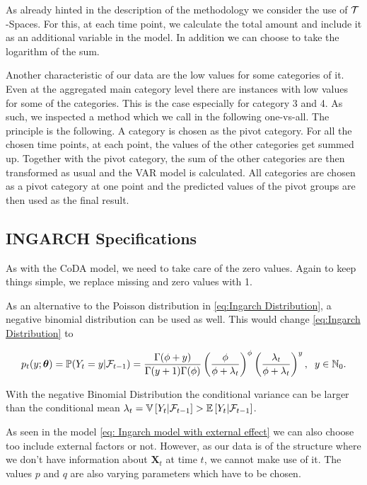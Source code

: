 As already hinted in the description of the methodology we consider the use of $\mathcal{T}$-Spaces. For this, at each time point, we calculate the total amount and include it as an additional variable in the model. In addition we can choose to take the logarithm of the sum. 

Another characteristic of our data are the low values for some categories of it. Even at the aggregated main category level there are instances with low values for some of the categories. This is the case especially for category 3 and 4. As such, we inspected a method which we call in the following one-vs-all. The principle is the following. A category is chosen as the pivot category. For all the chosen time points, at each point, the values of the other categories get summed up. Together with the pivot category, the sum of the other categories are then transformed as usual and the VAR model is calculated. All categories are chosen as a pivot category at one point and the predicted values of the pivot groups are then used as the final result. 


\subsection{INGARCH Specifications}
\label{sec: Ingarch Specifications}

As with the CoDA model, we need to take care of the zero values. Again to keep things simple, we replace missing and zero values with 1. 

As an alternative to the Poisson distribution in \ref{eq:Ingarch Distribution}, a negative binomial distribution can be used as well. This would change \ref{eq:Ingarch Distribution} to 

\begin{equation*}
p_t(y;\bm{\theta})=\mathbb{P}(Y_t=y | \mathcal{F}_{t-1}) = \frac{\Gamma(\phi+y)}{\Gamma(y+1)\Gamma(\phi)}\left(\frac{\phi}{\phi+\lambda_t}\right)^\phi\left(\frac{\lambda_t}{\phi+\lambda_t}\right)^y, \hspace{0.2cm} y \in \mathbb{N}_0.
\label{eq:Ingarch negbinom Distribution}
\end{equation*}

With the negative Binomial Distribution the conditional variance can be larger than the conditional mean $\lambda_t = \mathbb{V}\left[Y_t | \mathcal{F}_{t-1}\right] > \mathbb{E}\left[Y_t | \mathcal{F}_{t-1}\right]$.

As seen in the model \ref{eq: Ingarch model with external effect} we can also choose too include external factors or not. However, as our data is of the structure where we don't have information about $\bm{X}_t$ at time $t$, we cannot make use of it. The values $p$ and $q$ are also varying parameters which have to be chosen. 